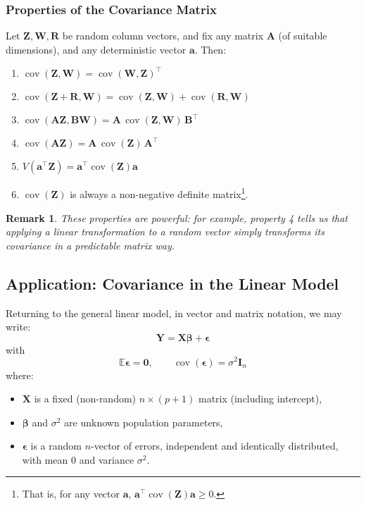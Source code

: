 \documentclass[12pt]{article}
\newtheorem{remark}[definition]{Remark}
\begin{document}
\subsubsection*{Properties of the Covariance Matrix}

Let $\boldsymbol{Z}, \boldsymbol{W}, \boldsymbol{R}$ be random column vectors, and fix any matrix $\boldsymbol{A}$ (of suitable dimensions), and any deterministic vector $\boldsymbol{a}$. Then:
\begin{enumerate}[label=\arabic*.]
    \item $\operatorname{cov}(\boldsymbol{Z}, \boldsymbol{W}) = \operatorname{cov}(\boldsymbol{W}, \boldsymbol{Z})^\top$
    \item $\operatorname{cov}(\boldsymbol{Z} + \boldsymbol{R}, \boldsymbol{W}) = \operatorname{cov}(\boldsymbol{Z}, \boldsymbol{W}) + \operatorname{cov}(\boldsymbol{R}, \boldsymbol{W})$
    \item $\operatorname{cov}(\boldsymbol{A}\boldsymbol{Z}, \boldsymbol{B}\boldsymbol{W}) = \boldsymbol{A}\, \operatorname{cov}(\boldsymbol{Z},\boldsymbol{W})\, \boldsymbol{B}^\top$
    \item $\operatorname{cov}(\boldsymbol{A}\boldsymbol{Z}) = \boldsymbol{A}\, \operatorname{cov}(\boldsymbol{Z})\, \boldsymbol{A}^\top$
    \item $V(\boldsymbol{a}^\top \boldsymbol{Z}) = \boldsymbol{a}^\top \operatorname{cov}(\boldsymbol{Z}) \boldsymbol{a}$
    \item $\operatorname{cov}(\boldsymbol{Z})$ is always a non-negative definite matrix\footnote{That is, for any vector $\boldsymbol{a}$, $\boldsymbol{a}^\top \operatorname{cov}(\boldsymbol{Z}) \boldsymbol{a} \geq 0$.}.
\end{enumerate}

\begin{remark}
These properties are powerful: for example, property 4 tells us that applying a linear transformation to a random vector simply transforms its covariance in a predictable matrix way.
\end{remark}

\subsection{Application: Covariance in the Linear Model}

Returning to the general linear model, in vector and matrix notation, we may write:
\[
    \boldsymbol{Y} = \boldsymbol{X} \boldsymbol{\beta} + \boldsymbol{\epsilon}
\]
with
\[
    \mathbb{E}\boldsymbol{\epsilon} = \mathbf{0}, \qquad \operatorname{cov}(\boldsymbol{\epsilon}) = \sigma^2 \boldsymbol{I}_n
\]
where:
\begin{itemize}
    \item $\boldsymbol{X}$ is a fixed (non-random) $n \times (p+1)$ matrix (including intercept),
    \item $\boldsymbol{\beta}$ and $\sigma^2$ are unknown population parameters,
    \item $\boldsymbol{\epsilon}$ is a random $n$-vector of errors, independent and identically distributed, with mean $0$ and variance $\sigma^2$.
\end{itemize}
\end{document}
